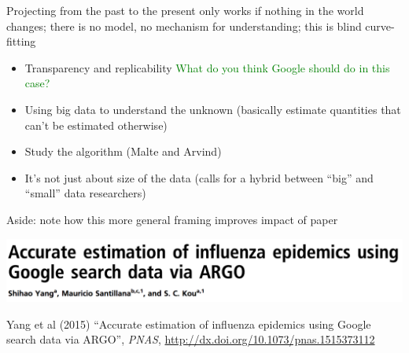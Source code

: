 \documentclass[aspectratio=169]{beamer}
\def\vf{\vfill}
\begin{document}
\begin{frame}

Projecting from the past to the present only works if nothing in the world changes; there is no model, no mechanism for understanding; this is blind curve-fitting

\end{frame}
\begin{frame}

\begin{itemize}
\item Transparency and replicability
\pause
\textcolor{green}{What do you think Google should do in this case?}
\item Using big data to understand the unknown (basically estimate quantities that can't be estimated otherwise)
\pause
\item Study the algorithm (Malte and Arvind)
\pause
\item It's not just about size of the data (calls for a hybrid between ``big'' and ``small'' data researchers)
\end{itemize}

\end{frame}
\begin{frame}

Aside: note how this more general framing improves impact of paper

\end{frame}
\begin{frame}

\begin{center}
\includegraphics[width=\textwidth]{figures/yang_accurate_2015_title}
\end{center}

\vf
Yang et al (2015) ``Accurate estimation of influenza epidemics using Google search data via ARGO'', \textit{PNAS}, \url{http://dx.doi.org/10.1073/pnas.1515373112}
\end{frame}
\end{document}
